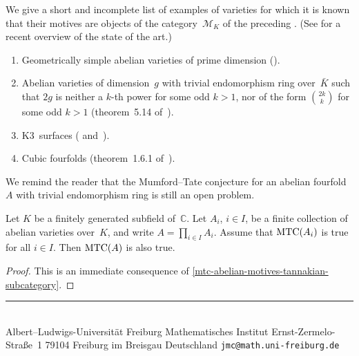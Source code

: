 \documentclass[10pt,twoside,leqno]{article}
\numberwithin{equation}{subsection}
\newcommand{\CC}{\mathbb{C}}
\newcommand{\MTC}{\textnormal{MTC}}
\begin{document}
\begin{remark} %
 We give a short and incomplete list of examples of varieties
 for which it is known that their motives
 are objects of the category~$\mathcal{M}_K$
 of the preceding .
 (See \cite{Mo17} for a recent overview of the state of the art.)
 \begin{enumerate}
  \item Geometrically simple abelian varieties of prime dimension (\cite{Ta83}).
  \item Abelian varieties of dimension~$g$
   with trivial endomorphism ring over~$\bar K$
   such that $2g$ is neither a $k$-th power for some odd $k > 1$,
   nor of the form $\binom{2k}{k}$ for some odd $k > 1$
   (theorem~5.14 of~\cite{Pi98}).
  \item K3~surfaces (\cite{MTCK3I} and~\cite{MTCK3II}).
  \item Cubic fourfolds (theorem~1.6.1 of~\cite{An96}).
 \end{enumerate}
 We remind the reader that the Mumford--Tate conjecture
 for an abelian fourfold~$A$ with trivial endomorphism ring
 is still an open problem.
\end{remark}

\begin{theorem} %
 \label{mtcaxa}
 Let $K$ be a finitely generated subfield of~$\CC$.
 Let $A_i$, $i \in I$, be a finite collection of abelian varieties over~$K$,
 and write $A = \prod_{i \in I} A_i$.
 Assume that $\MTC(A_i)$ is true for all $i \in I$.
 Then $\MTC(A)$ is also true.
 \begin{proof}
  This is an immediate consequence of
  \cref{mtc-abelian-motives-tannakian-subcategory}.
 \end{proof}
\end{theorem}


\printbibliography

\vfill

\hfill
\begin{minipage}{.5\textwidth}
 \noindent
 \rule{.99\textwidth}{.1pt}\\[-.3\baselineskip]
 \obeylines%
 Albert--Ludwigs-Universit\"at Freiburg
 Mathematisches Institut
 Ernst-Zermelo-Stra\ss{}e~1
 79104 Freiburg im Breisgau
 Deutschland
 \texttt{jmc@math.uni-freiburg.de}
\end{minipage}
\end{document}
